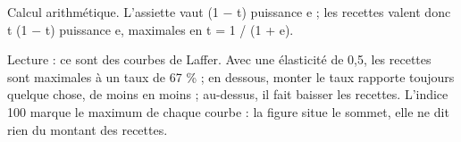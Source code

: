 Calcul arithmétique. L'assiette vaut (1 $-$ t) puissance e ; les recettes valent donc t (1 $-$ t) puissance e, maximales en t = 1 / (1 + e).\par Lecture : ce sont des courbes de Laffer. Avec une élasticité de 0,5, les recettes sont maximales à un taux de 67 \% ; en dessous, monter le taux rapporte toujours quelque chose, de moins en moins ; au-dessus, il fait baisser les recettes. L'indice 100 marque le maximum de chaque courbe : la figure situe le sommet, elle ne dit rien du montant des recettes.
